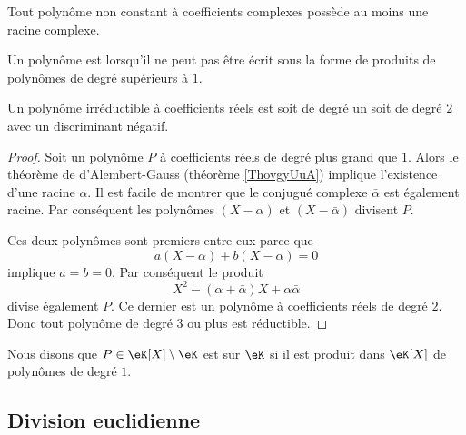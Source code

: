 \begin{theorem}      \label{ThovgyUuA}
    Tout polynôme non constant à coefficients complexes possède au moins une racine complexe.
\end{theorem}


\begin{definition}      \label{DefIrredfIqydS}
    Un polynôme est  lorsqu'il ne peut pas être écrit sous la forme de produits de polynômes de degré supérieurs à \( 1\).
\end{definition}

\begin{proposition}
    Un polynôme irréductible à coefficients réels est soit de degré un soit de degré \( 2\) avec un discriminant négatif.
\end{proposition}

\begin{proof}
    Soit un polynôme \( P\) à coefficients réels de degré plus grand que \( 1\). Alors le théorème de d'Alembert-Gauss (théorème \ref{ThovgyUuA}) implique l'existence d'une racine \( \alpha\). Il est facile de montrer que le conjugué complexe \( \bar \alpha\) est également racine. Par conséquent les polynômes \( (X-\alpha)\) et \( (X-\bar \alpha)\) divisent \( P\).

    Ces deux polynômes sont premiers entre eux parce que
    \begin{equation}
        a(X-\alpha)+b(X-\bar \alpha)=0
    \end{equation}
    implique \( a=b=0\). Par conséquent le produit 
    \begin{equation}
        X^2-(\alpha+\bar \alpha)X+\alpha\bar\alpha
    \end{equation}
    divise également \( P\). Ce dernier est un polynôme à coefficients réels de degré \( 2\). Donc tout polynôme de degré \( 3\) ou plus est réductible.
\end{proof}

Nous disons que \( P\in\eK[X]\setminus\eK\) est  sur \(\eK\) si il est produit dans \(\eK[X]\) de polynômes de degré \( 1\).

\subsection{Division euclidienne}

